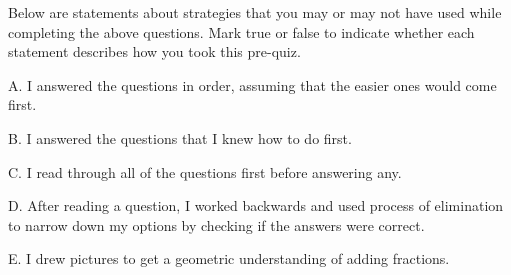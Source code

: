 \documentclass{ximera}
\begin{document}
\begin{question}

Below are statements about strategies that you may or may not have used while completing the above questions.  Mark true or false to indicate whether each statement describes how you took this pre-quiz. 

\begin{question}

    A. I answered the questions in order, assuming that the easier ones would come first.

    \begin{multipleChoice}
    \end{multipleChoice}
    
\end{question}
\begin{question}
    
    B. I answered the questions that I knew how to do first.

    \begin{multipleChoice}
    \end{multipleChoice}
    
\end{question}
\begin{question}
    
    C. I read through all of the questions first before answering any.

    \begin{multipleChoice}
    \end{multipleChoice}
    
\end{question}
\begin{question}
    
    D. After reading a question, I worked backwards and used process of elimination to narrow down my options by checking if the answers were correct.

    \begin{multipleChoice}
    \end{multipleChoice}
    
\end{question}
\begin{question}
    
    E. I drew pictures to get a geometric understanding of adding fractions.
    

\end{question}
\end{question}
\end{document}
